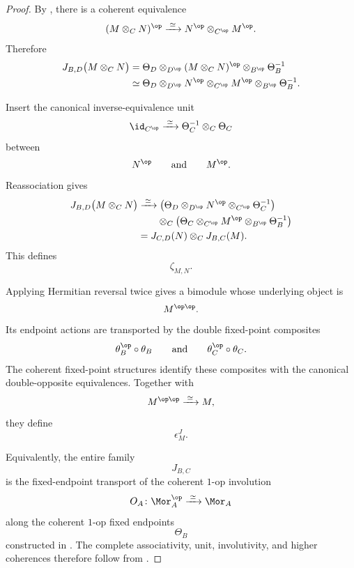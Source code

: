 \begin{proof}
By
,
there is a coherent equivalence
\[
    (M\otimes_CN)^{\op}
    \xrightarrow{\;\simeq\;}
    N^{\op}
    \otimes_{C^{\op}}
    M^{\op}.
\]
Therefore
\[
\begin{aligned}
    J_{B,D}
    \bigl(
        M\otimes_CN
    \bigr)
    &=
    \Theta_D
    \otimes_{D^{\op}}
    (M\otimes_CN)^{\op}
    \otimes_{B^{\op}}
    \Theta_B^{-1}
    \\
    &\simeq
    \Theta_D
    \otimes_{D^{\op}}
    N^{\op}
    \otimes_{C^{\op}}
    M^{\op}
    \otimes_{B^{\op}}
    \Theta_B^{-1}.
\end{aligned}
\]

Insert the canonical inverse-equivalence unit
\[
    \id_{C^{\op}}
    \xrightarrow{\;\simeq\;}
    \Theta_C^{-1}
    \otimes_C
    \Theta_C
\]
between
\[
    N^{\op}
    \qquad\text{and}\qquad
    M^{\op}.
\]
Reassociation gives
\[
\begin{aligned}
    J_{B,D}
    \bigl(
        M\otimes_CN
    \bigr)
    &\xrightarrow{\;\simeq\;}
    \bigl(
        \Theta_D
        \otimes_{D^{\op}}
        N^{\op}
        \otimes_{C^{\op}}
        \Theta_C^{-1}
    \bigr)
    \\
    &\qquad\otimes_C
    \bigl(
        \Theta_C
        \otimes_{C^{\op}}
        M^{\op}
        \otimes_{B^{\op}}
        \Theta_B^{-1}
    \bigr)
    \\
    &=
    J_{C,D}(N)
    \otimes_C
    J_{B,C}(M).
\end{aligned}
\]
This defines
\[
    \zeta_{M,N}.
\]

Applying Hermitian reversal twice gives a bimodule whose underlying
object is
\[
    M^{\op\op}.
\]
Its endpoint actions are transported by the double fixed-point
composites
\[
    \theta_B^{\op}\circ\theta_B
    \qquad\text{and}\qquad
    \theta_C^{\op}\circ\theta_C.
\]
The coherent fixed-point structures identify these composites with the
canonical double-opposite equivalences. Together with
\[
    M^{\op\op}
    \xrightarrow{\;\simeq\;}
    M,
\]
they define
\[
    \epsilon^J_M.
\]

Equivalently, the entire family
\[
    J_{B,C}
\]
is the fixed-endpoint transport of the coherent $1$-op involution
\[
    O_A
    \colon
    \Mor_A^{\op}
    \xrightarrow{\;\simeq\;}
    \Mor_A
\]
along the coherent $1$-op fixed endpoints
\[
    \Theta_B
\]
constructed in
.
The complete associativity, unit, involutivity, and higher coherences
therefore follow from
.
\end{proof}

